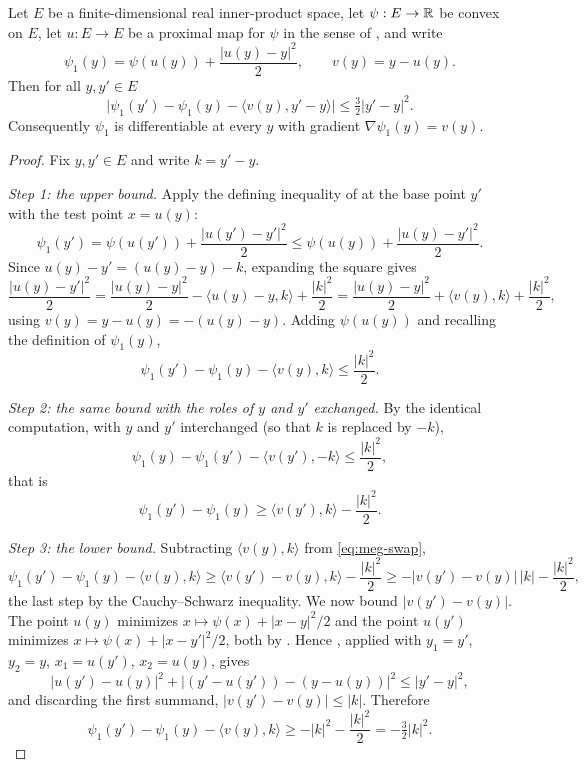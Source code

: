 \begin{lemma}
Let $E$ be a finite-dimensional real inner-product space, let $\psi:E\to\mathbb{R}$ be
convex on $E$, let $u:E\to E$ be a proximal map for $\psi$ in the sense of
, and write
\[
  \psi_1(y)=\psi(u(y))+\frac{|u(y)-y|^2}{2},\qquad v(y)=y-u(y).
\]
Then for all $y,y'\in E$
\[
  \bigl|\psi_1(y')-\psi_1(y)-\langle v(y),y'-y\rangle\bigr|
   \le\tfrac32|y'-y|^2 .
\]
Consequently $\psi_1$ is differentiable at every $y$ with gradient
$\nabla\psi_1(y)=v(y)$.
\end{lemma}
\begin{proof}
Fix $y,y'\in E$ and write $k=y'-y$.

\emph{Step 1: the upper bound.}
Apply the defining inequality of  at the base point $y'$
with the test point $x=u(y)$:
\[
  \psi_1(y')=\psi(u(y'))+\frac{|u(y')-y'|^2}{2}
   \le\psi(u(y))+\frac{|u(y)-y'|^2}{2}.
\]
Since $u(y)-y'=(u(y)-y)-k$, expanding the square gives
\[
  \frac{|u(y)-y'|^2}{2}
   =\frac{|u(y)-y|^2}{2}-\langle u(y)-y,k\rangle+\frac{|k|^2}{2}
   =\frac{|u(y)-y|^2}{2}+\langle v(y),k\rangle+\frac{|k|^2}{2},
\]
using $v(y)=y-u(y)=-(u(y)-y)$. Adding $\psi(u(y))$ and recalling the definition
of $\psi_1(y)$,
\begin{equation}\label{eq:meg-upper}
  \psi_1(y')-\psi_1(y)-\langle v(y),k\rangle\le\frac{|k|^2}{2}.
\end{equation}

\emph{Step 2: the same bound with the roles of $y$ and $y'$ exchanged.}
By the identical computation, with $y$ and $y'$ interchanged (so that $k$ is
replaced by $-k$),
\[
  \psi_1(y)-\psi_1(y')-\langle v(y'),-k\rangle\le\frac{|k|^2}{2},
\]
that is
\begin{equation}\label{eq:meg-swap}
  \psi_1(y')-\psi_1(y)\ge\langle v(y'),k\rangle-\frac{|k|^2}{2}.
\end{equation}

\emph{Step 3: the lower bound.}
Subtracting $\langle v(y),k\rangle$ from \eqref{eq:meg-swap},
\[
  \psi_1(y')-\psi_1(y)-\langle v(y),k\rangle
   \ge\langle v(y')-v(y),k\rangle-\frac{|k|^2}{2}
   \ge-\bigl|v(y')-v(y)\bigr|\,|k|-\frac{|k|^2}{2},
\]
the last step by the Cauchy--Schwarz inequality. We now bound
$|v(y')-v(y)|$. The point $u(y)$ minimizes $x\mapsto\psi(x)+|x-y|^2/2$ and the
point $u(y')$ minimizes $x\mapsto\psi(x)+|x-y'|^2/2$, both by
. Hence , applied with
$y_1=y'$, $y_2=y$, $x_1=u(y')$, $x_2=u(y)$, gives
\[
  |u(y')-u(y)|^2+\bigl|(y'-u(y'))-(y-u(y))\bigr|^2\le|y'-y|^2,
\]
and discarding the first summand, $|v(y')-v(y)|\le|k|$. Therefore
\begin{equation}\label{eq:meg-lower}
  \psi_1(y')-\psi_1(y)-\langle v(y),k\rangle
   \ge-|k|^2-\frac{|k|^2}{2}=-\tfrac32|k|^2 .
\end{equation}


\end{proof}
